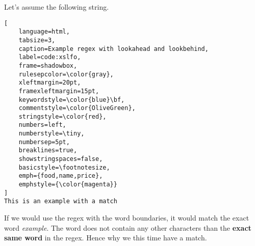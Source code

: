 Let's assume the following string.
\begin{lstlisting}[
	language=html,
	tabsize=3,
	caption=Example regex with lookahead and lookbehind,
	label=code:xslfo,
	frame=shadowbox,
	rulesepcolor=\color{gray},
	xleftmargin=20pt,
	framexleftmargin=15pt,
	keywordstyle=\color{blue}\bf,
	commentstyle=\color{OliveGreen},
	stringstyle=\color{red},
	numbers=left,
	numberstyle=\tiny,
	numbersep=5pt,
	breaklines=true,
	showstringspaces=false,
	basicstyle=\footnotesize,
	emph={food,name,price},
	emphstyle={\color{magenta}}
]
This is an example with a match
\end{lstlisting}
If we would use the regex with the word boundaries, it would match the exact word \textit{example}. The word does not contain any other characters than the \textbf{exact same word} in the regex. Hence why we this time have a match.
